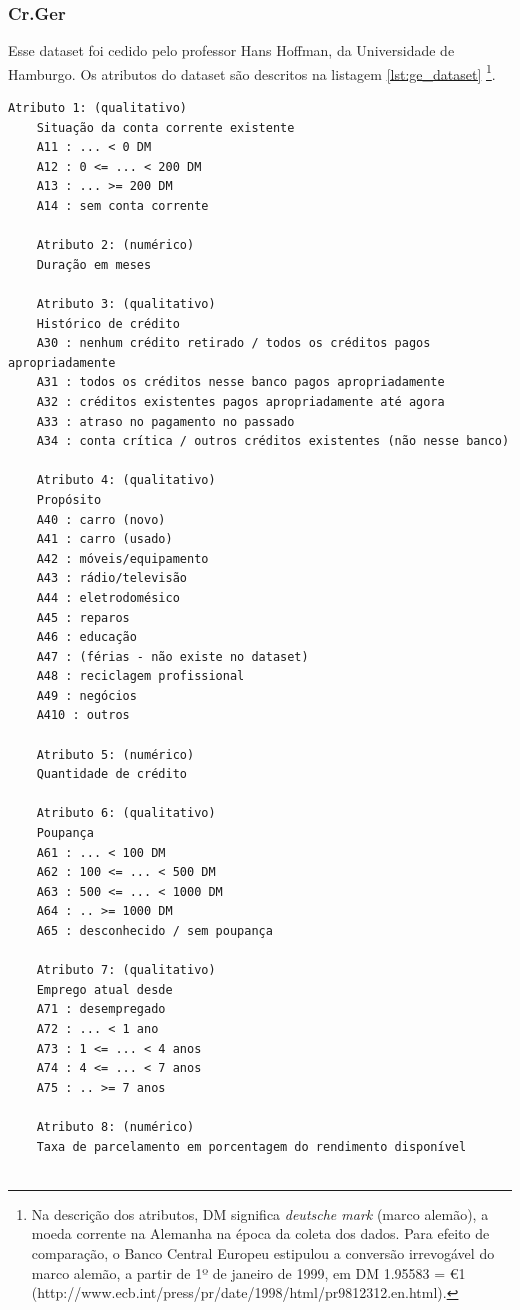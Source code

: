\subsubsection{Cr.Ger}

Esse dataset foi cedido pelo professor Hans Hoffman, da Universidade de Hamburgo. Os atributos do dataset são descritos na listagem \ref{lst:ge_dataset} \footnote{Na descrição dos atributos, DM significa \emph{deutsche mark} (marco alemão), a moeda corrente na Alemanha na época da coleta dos dados. Para efeito de comparação, o Banco Central Europeu estipulou a conversão irrevogável do marco alemão, a partir de 1º de janeiro de 1999, em DM 1.95583 = \euro 1 (http://www.ecb.int/press/pr/date/1998/html/pr981231\textunderscore{}2.en.html).}.

\begin{lstlisting}[caption=Atributos do dataset alemão,label=lst:ge_dataset]
    Atributo 1: (qualitativo)
    Situação da conta corrente existente
    A11 : ... < 0 DM
    A12 : 0 <= ... < 200 DM
    A13 : ... >= 200 DM
    A14 : sem conta corrente

    Atributo 2: (numérico)
    Duração em meses

    Atributo 3: (qualitativo)
    Histórico de crédito
    A30 : nenhum crédito retirado / todos os créditos pagos apropriadamente
    A31 : todos os créditos nesse banco pagos apropriadamente
    A32 : créditos existentes pagos apropriadamente até agora
    A33 : atraso no pagamento no passado
    A34 : conta crítica / outros créditos existentes (não nesse banco)

    Atributo 4: (qualitativo)
    Propósito
    A40 : carro (novo)
    A41 : carro (usado)
    A42 : móveis/equipamento
    A43 : rádio/televisão
    A44 : eletrodomésico
    A45 : reparos
    A46 : educação
    A47 : (férias - não existe no dataset)
    A48 : reciclagem profissional
    A49 : negócios
    A410 : outros

    Atributo 5: (numérico)
    Quantidade de crédito

    Atributo 6: (qualitativo)
    Poupança
    A61 : ... < 100 DM
    A62 : 100 <= ... < 500 DM
    A63 : 500 <= ... < 1000 DM
    A64 : .. >= 1000 DM
    A65 : desconhecido / sem poupança

    Atributo 7: (qualitativo)
    Emprego atual desde
    A71 : desempregado
    A72 : ... < 1 ano
    A73 : 1 <= ... < 4 anos
    A74 : 4 <= ... < 7 anos
    A75 : .. >= 7 anos

    Atributo 8: (numérico)
    Taxa de parcelamento em porcentagem do rendimento disponível


\end{lstlisting}
